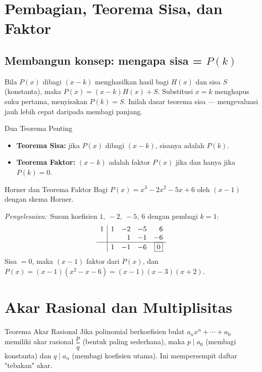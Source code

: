 \documentclass[11pt,a4paper]{report}
\theoremstyle{gaya}
\newcommand{\jawab}{\par\smallskip\noindent\textit{\textcolor{oranye}{Penyelesaian:}}\ }
\begin{document}
\section{Pembagian, Teorema Sisa, dan Faktor}

\subsection*{Membangun konsep: mengapa sisa = $P(k)$}
Bila $P(x)$ dibagi $(x-k)$ menghasilkan hasil bagi $H(x)$ dan sisa $S$ (konstanta), maka $P(x)=(x-k)H(x)+S$. Substitusi $x=k$ menghapus suku pertama, menyisakan $P(k)=S$. Inilah dasar teorema sisa --- mengevaluasi jauh lebih cepat daripada membagi panjang.

\begin{konsep}{Dua Teorema Penting}
\begin{itemize}[leftmargin=*,topsep=2pt]
  \item \textbf{Teorema Sisa:} jika $P(x)$ dibagi $(x-k)$, sisanya adalah $P(k)$.
  \item \textbf{Teorema Faktor:} $(x-k)$ adalah faktor $P(x)$ jika dan hanya jika $P(k)=0$.
\end{itemize}
\end{konsep}

\begin{contoh}{Horner dan Teorema Faktor}
Bagi $P(x) = x^3 - 2x^2 - 5x + 6$ oleh $(x-1)$ dengan skema Horner.

\jawab Susun koefisien $1,\ -2,\ -5,\ 6$ dengan pembagi $k=1$:
\[
\begin{array}{r|rrrr}
1 & 1 & -2 & -5 & 6\\
  &   & 1  & -1 & -6\\\hline
  & 1 & -1 & -6 & \boxed{0}
\end{array}
\]
Sisa $=0$, maka $(x-1)$ faktor dari $P(x)$, dan
$P(x) = (x-1)(x^2 - x - 6) = (x-1)(x-3)(x+2).$
\end{contoh}

\section{Akar Rasional dan Multiplisitas}
\begin{konsep}{Teorema Akar Rasional}
Jika polinomial berkoefisien bulat $a_nx^n+\cdots+a_0$ memiliki akar rasional $\dfrac{p}{q}$ (bentuk paling sederhana), maka $p\mid a_0$ (membagi konstanta) dan $q\mid a_n$ (membagi koefisien utama). Ini mempersempit daftar "tebakan" akar.
\end{konsep}
\end{document}
